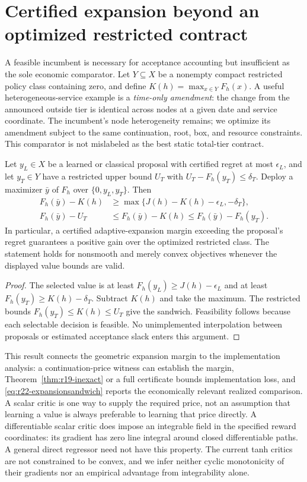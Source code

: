 \section{Certified expansion beyond an optimized restricted contract}\label{sec:r22-benchmark}
A feasible incumbent is necessary for acceptance accounting but insufficient as the sole economic comparator. Let $Y\subseteq X$ be a nonempty compact restricted policy class containing zero, and define $K(h)=\max_{x\in Y}F_h(x)$. A useful heterogeneous-service example is a \emph{time-only amendment}: the change from the announced outside tier is identical across nodes at a given date and service coordinate. The incumbent's node heterogeneity remains; we optimize its amendment subject to the same continuation, root, box, and resource constraints. This comparator is not mislabeled as the best static total-tier contract.

\begin{theorem}\label{thm:r22-expansion}
Let $y_L\in X$ be a learned or classical proposal with certified regret at most $\epsilon_L$, and let $y_T\in Y$ have a restricted upper bound $U_T$ with $U_T-F_h(y_T)\leq\delta_T$. Deploy a maximizer $\bar y$ of $F_h$ over $\{0,y_L,y_T\}$. Then
\begin{align}
 F_h(\bar y)-K(h)&\geq\max\{J(h)-K(h)-\epsilon_L,-\delta_T\},\label{eq:r22-expansion}\\
 F_h(\bar y)-U_T&\leq F_h(\bar y)-K(h)
 \leq F_h(\bar y)-F_h(y_T).\label{eq:r22-expansionsandwich}
\end{align}
In particular, a certified adaptive-expansion margin exceeding the proposal's regret guarantees a positive gain over the optimized restricted class. The statement holds for nonsmooth and merely convex objectives whenever the displayed value bounds are valid.
\end{theorem}
\begin{proof}
The selected value is at least $F_h(y_L)\geq J(h)-\epsilon_L$ and at least $F_h(y_T)\geq K(h)-\delta_T$. Subtract $K(h)$ and take the maximum. The restricted bounds $F_h(y_T)\leq K(h)\leq U_T$ give the sandwich. Feasibility follows because each selectable decision is feasible. No unimplemented interpolation between proposals or estimated acceptance slack enters this argument.
\end{proof}
This result connects the geometric expansion margin to the implementation analysis: a continuation-price witness can establish the margin, Theorem~\ref{thm:r19-inexact} or a full certificate bounds implementation loss, and \eqref{eq:r22-expansionsandwich} reports the economically relevant realized comparison. A scalar critic is one way to supply the required price, not an assumption that learning a value is always preferable to learning that price directly. A differentiable scalar critic does impose an integrable field in the specified reward coordinates: its gradient has zero line integral around closed differentiable paths. A general direct regressor need not have this property. The current tanh critics are not constrained to be convex, and we infer neither cyclic monotonicity of their gradients nor an empirical advantage from integrability alone.

